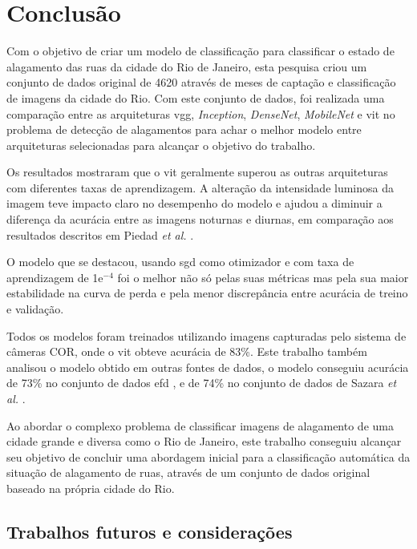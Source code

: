 \chapter{Conclusão}\label{cap:conclusoes}

Com o objetivo de criar um modelo de classificação para classificar o estado de alagamento das ruas da cidade do Rio de Janeiro,
esta pesquisa criou um conjunto de dados original de 4620 através de meses de captação e classificação de imagens da cidade do Rio.
Com este conjunto de dados, foi realizada uma comparação entre as arquiteturas \acrshort{vgg}, \textit{Inception}, \textit{DenseNet}, \textit{MobileNet} e \Acrshort{vit} no problema de detecção de alagamentos
para achar o melhor modelo entre arquiteturas selecionadas para alcançar o objetivo do trabalho.

Os resultados mostraram que o \acrshort{vit} geralmente superou as outras arquiteturas com diferentes taxas de aprendizagem. 
A alteração da intensidade luminosa da imagem teve impacto claro no desempenho do modelo e ajudou a diminuir a diferença da acurácia entre as imagens noturnas e diurnas, 
em comparação aos resultados descritos em Piedad \textit{et al.} \cite{piedad2022}.

O modelo que se destacou, usando \acrshort{sgd} como otimizador e com taxa de aprendizagem de 1e$^{-4}$ foi o melhor não só pelas suas métricas 
mas pela sua maior estabilidade na curva de perda e pela menor discrepância entre acurácia de treino e validação.

Todos os modelos foram treinados utilizando imagens capturadas pelo sistema de câmeras COR, onde o \acrshort{vit} obteve acurácia de 83\%. 
Este trabalho também analisou o modelo obtido em outras fontes de dados, o modelo conseguiu acurácia de 73\% no conjunto de dados \acrshort{efd} \cite{BarzSchroeterMuench2018_1000117723}, 
e de 74\% no conjunto de dados de Sazara \textit{et al.} \cite{sazara2019}.

Ao abordar o complexo problema de classificar imagens de alagamento de uma cidade grande e diversa como o Rio de Janeiro, 
este trabalho conseguiu alcançar seu objetivo de concluir uma abordagem inicial para a classificação automática da situação de alagamento de ruas, 
através de um conjunto de dados original baseado na própria cidade do Rio.

\section{Trabalhos futuros e considerações}

